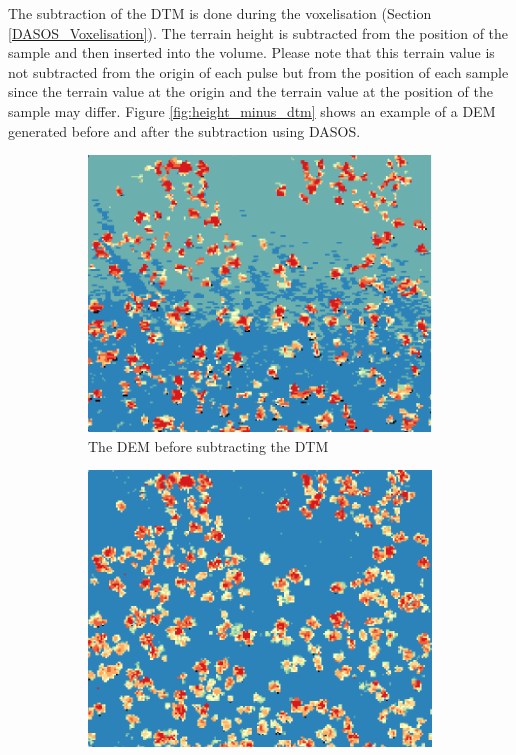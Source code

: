 \documentclass{subfiles}
\begin{document}
\par The subtraction of the DTM is done during the voxelisation (Section \ref{DASOS_Voxelisation}). The terrain height is subtracted from the position of the sample and then inserted into the volume. Please note that this terrain value is not subtracted from the origin of each pulse but from the position of each sample since the terrain value at the origin and the terrain value at the position of the sample may differ. Figure \ref{fig:height_minus_dtm} shows an example of a DEM generated before and after the subtraction using DASOS. 


\begin{figure} [h!]			
	\begin{subfigure}[t]{.49\textwidth}
		
		\centering
		\includegraphics[width=\textwidth]{img/dead/height}
		\caption{The DEM before subtracting the DTM}
		\label{fig:height}
	\end{subfigure} \hfill
	\begin{subfigure}[t]{.49\textwidth}
		\centering
		\includegraphics[width=\textwidth]{img/dead/height_dtm}

\end{subfigure}
\end{figure}
\end{document}

